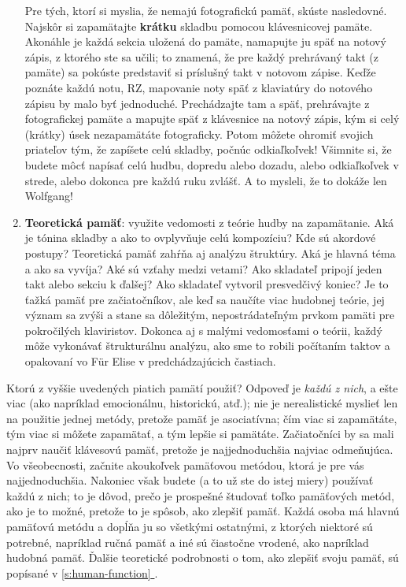 \documentclass[11pt,a4paper]{book}
\newcommand*{\fullref}[1]{\hyperref[{#1}]{\ref*{#1} \nameref*{#1}}} %
\begin{document}
\begin{enumerate}[(1)]
Pre tých, ktorí si myslia, že nemajú fotografickú pamäť, skúste nasledovné. Najskôr si zapamätajte \textbf{krátku} skladbu pomocou klávesnicovej pamäte. Akonáhle je každá sekcia uložená do pamäte, namapujte ju späť na notový zápis, z ktorého ste sa učili; to znamená, že pre každý prehrávaný takt (z pamäte) sa pokúste predstaviť si príslušný takt v notovom zápise. Keďže poznáte každú notu, RZ, mapovanie noty späť z klaviatúry do notového zápisu by malo byť jednoduché. Prechádzajte tam a späť, prehrávajte z fotografickej pamäte a mapujte späť z klávesnice na notový zápis, kým si celý (krátky) úsek nezapamätáte fotograficky. Potom môžete ohromiť svojich priateľov tým, že zapíšete celú skladby, počnúc odkiaľkoľvek! Všimnite si, že budete môcť napísať celú hudbu, dopredu alebo dozadu, alebo odkiaľkoľvek v strede, alebo dokonca pre každú ruku zvlášť. A to mysleli, že to dokáže len Wolfgang!

\item \textbf{Teoretická pamäť}: využite vedomosti z teórie hudby na zapamätanie. Aká je tónina skladby a ako to ovplyvňuje celú kompozíciu? Kde sú akordové postupy? Teoretická pamäť zahŕňa aj analýzu štruktúry. Aká je hlavná téma a ako sa vyvíja? Aké sú vzťahy medzi vetami? Ako skladateľ pripojí jeden takt alebo sekciu k ďalšej? Ako skladateľ vytvoril presvedčivý koniec? Je to ťažká pamäť pre začiatočníkov, ale keď sa naučíte viac hudobnej teórie, jej význam sa zvýši a stane sa dôležitým, nepostrádateľným prvkom pamäti pre pokročilých klaviristov. Dokonca aj s malými vedomosťami o teórii, každý môže vykonávať štrukturálnu analýzu, ako sme to robili počítaním taktov a opakovaní vo Für Elise v predchádzajúcich častiach.
\end{enumerate}

Ktorú z vyššie uvedených piatich pamätí použiť? Odpoveď je \textit{každú z nich}, a ešte viac (ako napríklad emocionálnu, historickú, atď.); nie je nerealistické myslieť len na použitie jednej metódy, pretože pamäť je asociatívna; čím viac si zapamätáte, tým viac si môžete zapamätať, a tým lepšie si pamätáte. Začiatočníci by sa mali najprv naučiť klávesovú pamäť, pretože je najjednoduchšia najviac odmeňujúca. Vo všeobecnosti, začnite akoukoľvek pamäťovou metódou, ktorá je pre vás najjednoduchšia. Nakoniec však budete (a to už ste do istej miery) používať každú z nich; to je dôvod, prečo je prospešné študovať toľko pamäťových metód, ako je to možné, pretože to je spôsob, ako zlepšiť pamäť. Každá osoba má hlavnú pamäťovú metódu a dopĺňa ju so všetkými ostatnými, z ktorých niektoré sú potrebné, napríklad ručná pamäť a iné sú čiastočne vrodené, ako napríklad hudobná pamäť. Ďalšie teoretické podrobnosti o tom, ako zlepšiť svoju pamäť, sú popísané v \fullref{s:human-function}.
\end{document}
